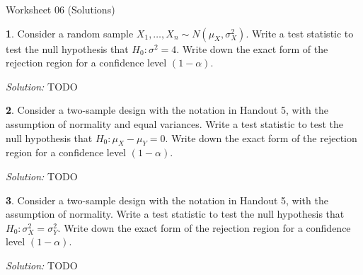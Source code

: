 \documentclass{tufte-handout}
\begin{document}
\justify

{\LARGE Worksheet 06 (Solutions)}

\vspace*{18pt}


\textbf{1}. Consider a random sample $X_1, \ldots, X_n \sim N(\mu_X, \sigma^2_X)$. 
Write a test statistic to test the null hypothesis that $H_0: \sigma^2 = 4$.
Write down the exact form of the rejection region for a confidence level 
$(1 - \alpha)$.

\textit{Solution:} TODO

\textbf{2}. Consider a two-sample design with the notation in Handout 5, with the assumption
of normality and equal variances. Write a test statistic to test the null
hypothesis that $H_0: \mu_X - \mu_Y = 0$. Write down the exact form of the
rejection region for a confidence level  $(1 - \alpha)$.

\textit{Solution:} TODO

\textbf{3}. Consider a two-sample design with the notation in Handout 5, with the assumption
of normality. Write a test statistic to test the null
hypothesis that $H_0: \sigma_X^2 = \sigma_Y^2$. Write down the exact form of the
rejection region for a confidence level  $(1 - \alpha)$.

\textit{Solution:} TODO
\end{document}
